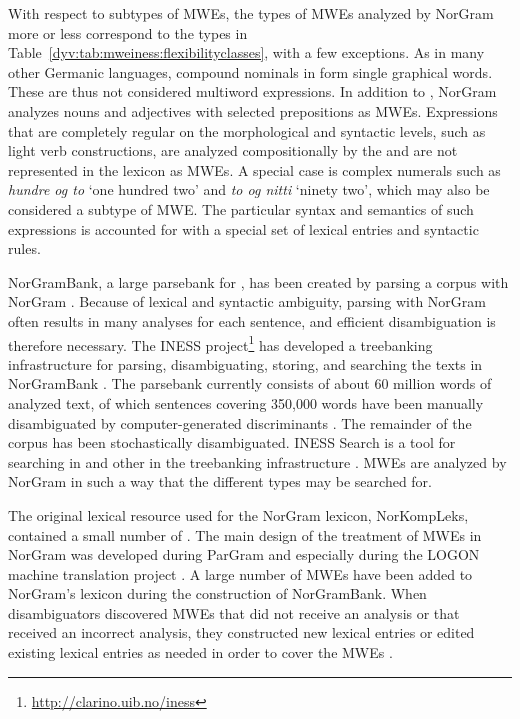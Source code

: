 \documentclass[output=paper]{langsci/langscibook}
\begin{document}
With respect to subtypes of MWEs, the types of MWEs analyzed by NorGram more or less correspond to the types in Table~\ref{dyv:tab:mweiness:flexibilityclasses}, with a few exceptions. 
As in many other Germanic languages, compound nominals in  form single graphical words. 
These are thus not considered multiword expressions.
In addition to , NorGram analyzes nouns and adjectives with selected prepositions as MWEs.
Expressions that are completely regular on the morphological and syntactic levels, such as light verb constructions, are analyzed compositionally by the  and are not represented in the lexicon as MWEs.
A special case is complex numerals such as \emph{hundre og to} `one hundred two' and  \emph{to og nitti} `ninety two', which may also be considered a subtype of MWE.
The particular syntax and semantics of such expressions is accounted for with a special set of lexical entries and syntactic rules.

NorGramBank, a large parsebank for , has been created by parsing a corpus with NorGram \citep{dyvik16}.
Because of lexical and syntactic ambiguity, parsing with NorGram often results in many analyses for each sentence, and efficient disambiguation is therefore necessary.
The INESS project\footnote{\url{http://clarino.uib.no/iness}} has developed a treebanking infrastructure for parsing, disambiguating, storing, and searching the texts in NorGramBank \citep{rosen12lrec}.
The parsebank currently consists of about 60 million words of analyzed text, of which sentences covering 350,000 words have been manually disambiguated by computer-generated discriminants \citep{rosen07lfg}.
The remainder of the corpus has been stochastically disambiguated.
INESS Search is a tool for searching in  and other  in the treebanking infrastructure \citep{meurer12}.
MWEs are analyzed by NorGram in such a way that the different types may be searched for.

The original lexical resource used for the NorGram lexicon, NorKompLeks, contained a small number of  \citep{nordgard00}.
The main design of the treatment of MWEs in NorGram was developed during ParGram \citep{pargram02} and especially during the LOGON machine translation project \citep{lonning04}.
A large number of MWEs have been added to NorGram’s lexicon during the construction of NorGramBank.
When disambiguators discovered MWEs that did not receive an analysis or that received an incorrect analysis, they constructed new lexical entries or edited existing lexical entries as needed in order to cover the MWEs \citep{losnegaard12,rosen16lre}.
\end{document}
